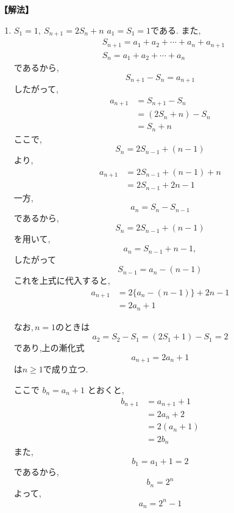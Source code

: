     \noindent\textbf{【解法】}
    \begin{enumerate}[label=(\arabic*),parsep=3pt]
    \item $\displaystyle S_1=1,\ S_{n+1}=2S_n+n$
        $a_1=S_1=1$である.
        また,
        \begin{align*}
          &S_{n+1}=a_1+a_2+\cdots+a_n+a_{n+1}\\
          &S_n=a_1+a_2+\cdots+a_n
        \end{align*}
        であるから,
        \[
          S_{n+1}-S_n=a_{n+1}
        \]
        したがって,
        \begin{align*}
          a_{n+1}
            &=S_{n+1}-S_n\\
            &=(2S_n+n)-S_n\\
            &=S_n+n
        \end{align*}
        ここで,
        \[
          S_n=2S_{n-1}+(n-1)
        \]
        より,
        \begin{align*}
          a_{n+1}
            &=2S_{n-1}+(n-1)+n\\
            &=2S_{n-1}+2n-1
        \end{align*}
        一方,
        \[
          a_n=S_n-S_{n-1}
        \]
        であるから,
        \[
          S_n=2S_{n-1}+(n-1)
        \]
        を用いて,
        \[
          a_n=S_{n-1}+n-1,
        \]
        したがって
        \[
          S_{n-1}=a_n-(n-1)
        \]
        これを上式に代入すると,
        \begin{align*}
          a_{n+1}
            &=2\{a_n-(n-1)\}+2n-1\\
            &=2a_n+1
        \end{align*}

        なお,\,$n=1$のときは
        \[
          a_2=S_2-S_1=(2S_1+1)-S_1=2
        \]
        であり,上の漸化式
        \[
          a_{n+1}=2a_n+1
        \]
        は$n\ge1$で成り立つ.

        ここで $b_n=a_n+1$ とおくと,
        \begin{align*}
          b_{n+1}
            &=a_{n+1}+1\\
            &=2a_n+2\\
            &=2(a_n+1)\\
            &=2b_n
        \end{align*}
        また,
        \[
          b_1=a_1+1=2
        \]
        であるから,
        \[
          b_n=2^n
        \]
        よって,
        \[
          a_n=2^n-1
        \]
    \end{enumerate}

